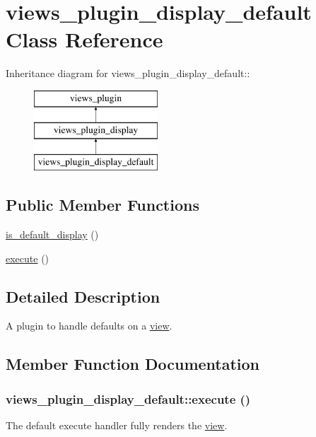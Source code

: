 \hypertarget{classviews__plugin__display__default}{
\section{views\_\-plugin\_\-display\_\-default Class Reference}
\label{classviews__plugin__display__default}
}
Inheritance diagram for views\_\-plugin\_\-display\_\-default::\begin{figure}[H]
\begin{center}
\leavevmode
\includegraphics[height=3cm]{classviews__plugin__display__default}
\end{center}
\end{figure}
\subsection*{Public Member Functions}
\begin{DoxyCompactItemize}
\item 
\hyperlink{classviews__plugin__display__default_a721b29f71ff0536dfcf28831e4b96e72}{is\_\-default\_\-display} ()
\item 
\hyperlink{classviews__plugin__display__default_acceee9203c7f628f686147944442fecd}{execute} ()
\end{DoxyCompactItemize}


\subsection{Detailed Description}
A plugin to handle defaults on a \hyperlink{classview}{view}. 

\subsection{Member Function Documentation}
\hypertarget{classviews__plugin__display__default_acceee9203c7f628f686147944442fecd}{
\subsubsection[{execute}]{\setlength{\rightskip}{0pt plus 5cm}views\_\-plugin\_\-display\_\-default::execute ()}}
\label{classviews__plugin__display__default_acceee9203c7f628f686147944442fecd}
The default execute handler fully renders the \hyperlink{classview}{view}.

